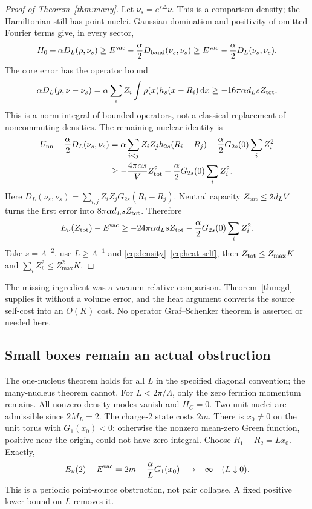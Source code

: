 \begin{proof}[Proof of Theorem~\ref{thm:many}]
Let $\nu_s=e^{s\Delta}\nu$. This is a comparison density; the
Hamiltonian still has point nuclei. Gaussian domination and positivity
of omitted Fourier terms give, in every sector,
\[
H_0+\alpha D_L(\rho,\nu_s)
\ge E^{\mathrm{vac}}-\frac\alpha2D_{\rm band}(\nu_s,\nu_s)
\ge E^{\mathrm{vac}}-\frac\alpha2D_L(\nu_s,\nu_s).
\]
The core error has the operator bound
\begin{equation}
\alpha D_L(\rho,\nu-\nu_s)
=\alpha\sum_i Z_i\int\rho(x)h_s(x-R_i)\,\mathrm d x
\ge-16\pi\alpha d_LsZ_{\rm tot}.
\label{eq:core}
\end{equation}
This is a norm integral of bounded operators, not a classical
replacement of noncommuting densities.
The remaining nuclear identity is
\begin{align}
U_{\rm nn}-\frac\alpha2D_L(\nu_s,\nu_s)
&=\alpha\sum_{i<j}Z_iZ_jh_{2s}(R_i-R_j)
-\frac\alpha2G_{2s}(0)\sum_iZ_i^2\\
&\ge-\frac{4\pi\alpha s}{V}Z_{\rm tot}^2
-\frac\alpha2G_{2s}(0)\sum_iZ_i^2.
\label{eq:nuclear-heat}
\end{align}
Here $D_L(\nu_s,\nu_s)=\sum_{i,j}Z_iZ_jG_{2s}(R_i-R_j)$.
Neutral capacity $Z_{\rm tot}\le2d_LV$ turns the first error into
$8\pi\alpha d_LsZ_{\rm tot}$. Therefore
\begin{equation}
E_\nu(Z_{\rm tot})-E^{\mathrm{vac}}
\ge-24\pi\alpha d_LsZ_{\rm tot}
-\frac\alpha2G_{2s}(0)\sum_iZ_i^2.
\label{eq:all-s}
\end{equation}
Take $s=\Lambda^{-2}$, use $L\ge\Lambda^{-1}$ and
\eqref{eq:density}--\eqref{eq:heat-self}, then
$Z_{\rm tot}\le Z_{\max}K$ and $\sum_iZ_i^2\le Z_{\max}^2K$.
\end{proof}

The missing ingredient was a vacuum-relative comparison.
Theorem~\ref{thm:gd} supplies it without a volume error, and the
heat argument converts the source self-cost into an $O(K)$ cost.
No operator Graf--Schenker theorem is asserted or needed here.

\subsection{Small boxes remain an actual obstruction}
The one-nucleus theorem holds for all $L$ in the specified diagonal
convention; the many-nucleus theorem cannot.
For $L<2\pi/\Lambda$, only the zero fermion momentum remains.
All nonzero density modes vanish and $H_C=0$.
Two unit nuclei are admissible since $2M_L=2$.
The charge-$2$ state costs $2m$.
There is $x_0\ne0$ on the unit torus with $G_1(x_0)<0$:
otherwise the nonzero mean-zero Green function, positive near the
origin, could not have zero integral.
Choose $R_1-R_2=Lx_0$. Exactly,
\begin{equation}
E_\nu(2)-E^{\mathrm{vac}}=2m+\frac{\alpha}{L}G_1(x_0)
\longrightarrow-\infty\quad(L\downarrow0).
\label{eq:small-box}
\end{equation}
This is a periodic point-source obstruction, not pair collapse.
A fixed positive lower bound on $L$ removes it.
